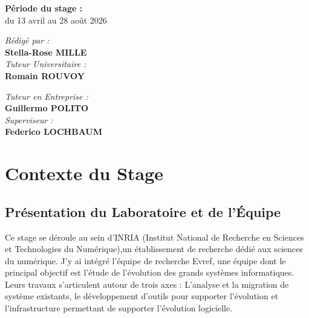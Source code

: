 \documentclass[11pt,a4paper]{report}
\begin{document}
\begin{titlepage}
    {\fontsize{12}{14}\selectfont\bfseries Période du stage :}\\
    {\fontsize{11}{13}\selectfont du 13 avril au 28 août 2026}\\[2cm]
    
    \begin{minipage}{0.48\textwidth}
        \begin{flushleft} \large
            \emph{Rédigé par :}\\
            \textbf{Stella-Rose MILLE}\\[0.6cm]
        
            \emph{Tuteur Universitaire :}\\
            \textbf{Romain ROUVOY}
        \end{flushleft}
    \end{minipage}
    \hfill
    \begin{minipage}{0.48\textwidth}
        \begin{flushright} \large
            \emph{Tuteur en Entreprise :}\\
            \textbf{Guillermo POLITO}\\[0.6cm]

            \emph{Superviseur :}\\
            \textbf{Federico LOCHBAUM}\\[0.6cm]
            
        \end{flushright}
    \end{minipage}
    
    \vfill
\end{titlepage}

\tableofcontents

\chapter{Contexte du Stage}
\label{ch:contexte}

\section{Présentation du Laboratoire et de l'Équipe}
Ce stage se déroule au sein d'INRIA (Institut National de Recherche en Sciences 
et Technologies du Numérique),un établissement de recherche dédié aux 
sciences du numérique. 
J'y ai intégré l'équipe de recherche Evref, une équipe dont le principal
objectif est l'étude de l'évolution des grands systèmes 
informatiques. Leurs travaux s'articulent autour de trois axes :
L'analyse et la migration de système existants, le développement d'outils pour supporter l'évolution et 
l'infrastructure permettant de supporter l'évolution logicielle.
\end{document}
